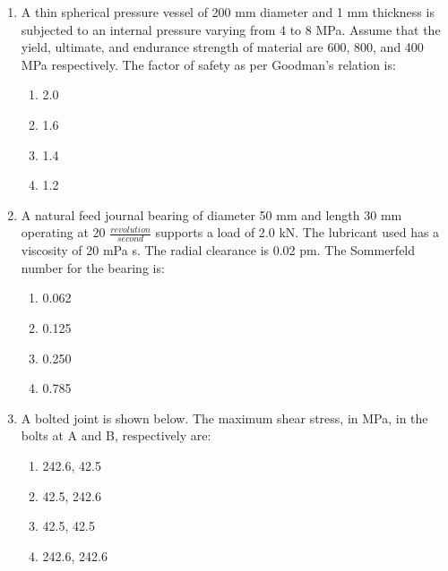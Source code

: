 \documentclass[journal,9pt,onecolumn]{IEEEtran}
\begin{document}
\begin{enumerate}
\item A thin spherical pressure vessel of 200 mm diameter and 1 mm thickness is subjected to an internal pressure varying from 4 to 8 MPa. Assume that the yield, ultimate, and endurance strength of material are 600, 800, and 400 MPa respectively. The factor of safety as per Goodman's relation is:
\begin{multicols}{4}
\begin{enumerate}
    \item 2.0
    \item 1.6
    \item 1.4
    \item 1.2
\end{enumerate}
\end{multicols}




\item  A natural feed journal bearing of diameter 50 mm and length 30 mm operating at 20 $\frac{revolution}{second}$ supports a load of 2.0 kN. The lubricant used has a viscosity of 20 mPa s. The radial clearance is 0.02 pm. The Sommerfeld number for the bearing is:
\begin{multicols}{4}
\begin{enumerate}
     \item 0.062
    \item 0.125
    \item 0.250
    \item 0.785
\end{enumerate}
\end{multicols}



\item A bolted joint is shown below. The maximum shear stress, in MPa, in the bolts at A and B, respectively are:
    \begin{center}
 
 \end{center}
\begin{multicols}{4}
\begin{enumerate}
    \item 242.6, 42.5
    \item 42.5, 242.6
    \item 42.5, 42.5
    \item 242.6, 242.6
\end{enumerate}
\end{multicols}



\end{enumerate}
\end{document}
